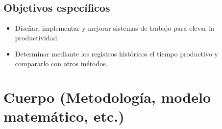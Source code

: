     \subsection{Objetivos específicos }
    
    \begin{itemize}
    \item Diseñar, implementar y mejorar sistemas de trabajo para elevar la productividad.
    \item Determinar mediante los registros históricos el tiempo productivo y compararlo con otros métodos.
    \end{itemize}
    
    \section{Cuerpo (Metodología, modelo matemático, etc.)}
    
